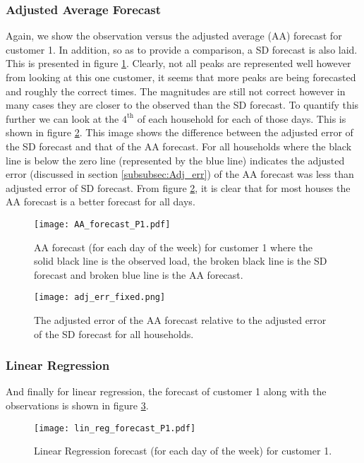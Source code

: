 \documentclass[a4paper]{article}
\begin{document}
\subsubsection{Adjusted Average Forecast} \label{subsubsec:AA_res}
Again, we show the observation versus the adjusted average (AA) forecast for customer 1. In addition, so as to provide a comparison, a SD forecast is also laid. This is presented in figure \ref{fig:AA_forecast_P1}. Clearly, not all peaks are represented well however from looking at this one customer, it seems that more peaks are being forecasted and roughly the correct times. The magnitudes are still not correct however in many cases they are closer to the observed than the SD forecast. To quantify this further we can look at the $4^{\text{th}}$ of each household for each of those days. This is shown in figure \ref{fig:adj_err_diff}. This image shows the difference between the adjusted error of the SD forecast and that of the AA forecast. For all households where the black line is below the zero line (represented by the blue line) indicates the adjusted error (discussed in section \ref{subsubsec:Adj_err}) of the AA forecast was less than adjusted error of SD forecast. From figure \ref{fig:adj_err_diff}, it is clear that for most houses the AA forecast is a better forecast for all days.

\begin{figure}
\centering
\texttt{[image: AA\_forecast\_P1.pdf]}
\caption{AA forecast (for each day of the week) for customer 1 where the solid black line is the observed load, the broken black line is the SD forecast and broken blue line is the AA forecast.}
\label{fig:AA_forecast_P1} 
\end{figure}

\begin{figure}
\centering
\texttt{[image: adj\_err\_fixed.png]}
\caption{The adjusted error of the AA forecast relative to the adjusted error of the SD forecast for all households.}
\label{fig:adj_err_diff} 
\end{figure}

\subsubsection{Linear Regression} \label{subsubsec:lin_reg_res}
And finally for linear regression, the forecast of customer 1 along with the observations is shown in figure \ref{fig:LR_forecast_P1}.

\begin{figure}
\centering
\texttt{[image: lin\_reg\_forecast\_P1.pdf]}
\caption{Linear Regression forecast (for each day of the week) for customer 1.}
\label{fig:LR_forecast_P1} 
\end{figure}
\end{document}
